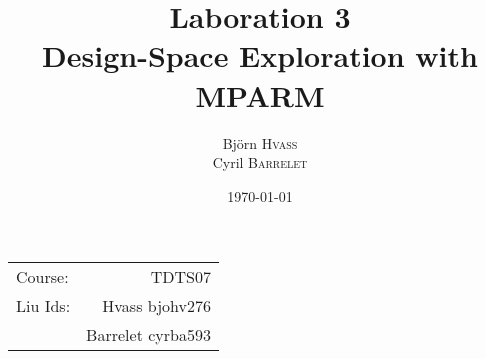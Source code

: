 \documentclass{article}
\title{Laboration 3 \\ Design-Space Exploration with MPARM} %
\author{
  Björn \textsc{Hvass}\\
  Cyril \textsc{Barrelet}
} %
\date{\today} %
\begin{document}
\maketitle %

\begin{center}
\begin{tabular}{l r}
Course: & TDTS07\\ %
Liu Ids: & Hvass bjohv276\\ %
& Barrelet cyrba593 \\
\end{tabular}
\end{center}


\newpage
\newpage
\newpage


\end{document}
